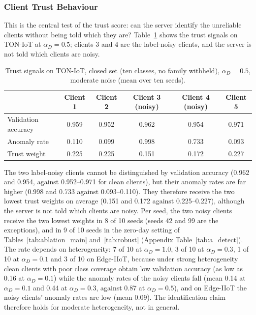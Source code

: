 \documentclass[pdflatex,sn-mathphys-num]{sn-jnl}
\newcommand{\Rtwo}{\color{blue}}
\begin{document}
{\subsubsection{Client Trust Behaviour}\label{sec:trust_results}
This is the central test of the trust score: can the server identify the unreliable clients without being told which they are? Table~\ref{tab:trust} shows the trust signals on TON-IoT at $\alpha_D=0.5$; clients 3 and 4 are the label-noisy clients, and the server is not told which clients are noisy.
{\color{black}
\begin{table}[!htbp]\centering
\caption{Trust signals on TON-IoT, closed set (ten classes, no family withheld), $\alpha_D=0.5$, moderate noise (mean over ten seeds).}\label{tab:trust}
\footnotesize
\setlength{\tabcolsep}{4pt}
\begin{tabular}{lccccc}\toprule
 & Client 1 & Client 2 & Client 3 (noisy) & Client 4 (noisy) & Client 5 \\ \midrule
Validation accuracy & 0.959 & 0.952 & 0.962 & 0.954 & 0.971 \\
Anomaly rate & 0.110 & 0.099 & 0.998 & 0.733 & 0.093 \\
Trust weight & 0.225 & 0.225 & 0.151 & 0.172 & 0.227 \\
\bottomrule\end{tabular}
\end{table}

The two label-noisy clients cannot be distinguished by validation accuracy (0.962 and 0.954, against 0.952--0.971 for clean clients), but their anomaly rates are far higher (0.998 and 0.733 against 0.093--0.110). They therefore receive the two lowest trust weights on average (0.151 and 0.172 against 0.225--0.227), although the server is not told which clients are noisy. {\Rtwo Per seed, the two noisy clients receive the two lowest weights in 8 of 10 seeds (seeds 42 and 99 are the exceptions), and in 9 of 10 seeds in the zero-day setting of Tables~\ref{tab:ablation_main} and~\ref{tab:robust} (Appendix Table~\ref{tab:a_detect}). The rate depends on heterogeneity: 7 of 10 at $\alpha_D=1.0$, 3 of 10 at $\alpha_D=0.3$, 1 of 10 at $\alpha_D=0.1$ and 3 of 10 on Edge-IIoT, because under strong heterogeneity clean clients with poor class coverage obtain low validation accuracy (as low as 0.16 at $\alpha_D=0.1$) while the anomaly rates of the noisy clients fall (mean 0.14 at $\alpha_D=0.1$ and 0.44 at $\alpha_D=0.3$, against 0.87 at $\alpha_D=0.5$), and on Edge-IIoT the noisy clients' anomaly rates are low (mean 0.09). The identification claim therefore holds for moderate heterogeneity, not in general.}

}}
\end{document}
